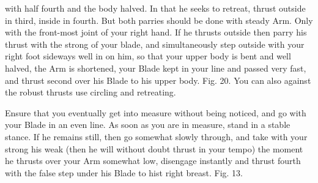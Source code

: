 \newpage


\newpage



with half fourth and the body halved. In that he seeks to retreat, thrust outside in third, inside in fourth. But both parries should be done with steady Arm. Only with the front-most joint of your right hand. If he thrusts outside then parry his thrust with the strong of your blade, and simultaneously step outside with your right foot sideways well in on him, so that your upper body is bent and well halved, the Arm is shortened, your Blade kept in your line and passed very fast, and thrust second over his Blade to his upper body. Fig. 20. You can also against the robust thrusts use circling and retreating.

\exercise{}


Ensure that you eventually get into measure without being noticed, and go with your Blade in an even line. As soon as you are in measure, stand in a stable stance. If he remains still, then go somewhat slowly through, and take with your strong his weak (then he will without doubt thrust in your tempo) the moment he thrusts over your Arm somewhat low, disengage instantly and thrust fourth with the false step under his Blade to hist right breast. Fig. 13.

